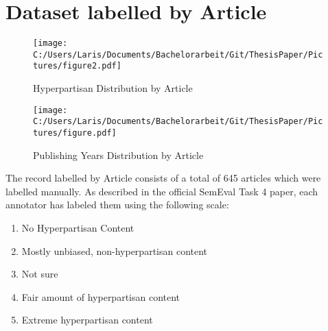 \documentclass[a4paper, 11pt,titlepage,oneside,openany]{book}
\begin{document}

\newpage
\section{Dataset labelled by Article}
\begin{figure}[h]
	\begin{minipage}{.45\linewidth}
		\texttt{[image: C:/Users/Laris/Documents/Bachelorarbeit/Git/ThesisPaper/Pictures/figure2.pdf]}
		\caption{Hyperpartisan Distribution by Article}
	\end{minipage}
	\hspace{.1\linewidth}%
	\begin{minipage}{.45\linewidth}
		\texttt{[image: C:/Users/Laris/Documents/Bachelorarbeit/Git/ThesisPaper/Pictures/figure.pdf]}
		\caption{Publishing Years Distribution by Article}
	\end{minipage}
\end{figure}
The record labelled by Article consists of a total of 645 articles which were labelled manually. As described in the official SemEval Task 4 paper, each annotator has labeled them using the following scale:
\begin{enumerate}
	\item No Hyperpartisan Content
	\item Mostly unbiased, non-hyperpartisan content
	\item Not sure
	\item Fair amount of hyperpartisan content
	\item Extreme hyperpartisan content
\end{enumerate}
\end{document}
